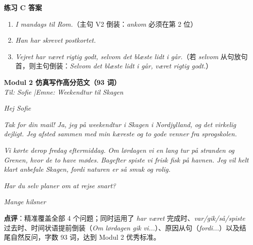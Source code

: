 \begin{answerbox}
\textbf{练习 C 答案}
\begin{enumerate}
  \item \textit{I mandags  til Rom.}（主句 V2 倒装：\textit{ankom} 必须在第 2 位）
  \item \textit{Han har  skrevet postkortet.}
  \item \textit{Vejret har været rigtig godt, selvom det blæste lidt i går.}（若 \textit{selvom} 从句放句首，则主句倒装：\textit{Selvom det blæste lidt i går,  været rigtig godt.}）
\end{enumerate}

\textbf{Modul 2 仿真写作高分范文（93 词）}\\
\textit{Til: Sofie \quad|\quad Emne: Weekendtur til Skagen}

\textit{Hej Sofie}

\textit{Tak for din mail! Ja, jeg  på weekendtur i Skagen i Nordjylland, og det  virkelig dejligt. Jeg  afsted sammen med min kæreste og to gode venner fra sprogskolen.}

\textit{Vi kørte derop fredag eftermiddag. Om lørdagen  vi en lang tur på stranden og  Grenen, hvor de to have mødes. Bagefter spiste vi frisk fisk på havnen. Jeg vil helt klart anbefale Skagen, fordi naturen er så smuk og rolig.}

\textit{Har du selv planer om at rejse snart?}

\textit{Mange hilsner\\
}

\small\textbf{点评}：精准覆盖全部 4 个问题；同时运用了 \textit{har været} 完成时、\textit{var/gik/så/spiste} 过去时、时间状语提前倒装（\textit{Om lørdagen gik vi...}）、原因从句（\textit{fordi...}）以及结尾自然反问，字数 93 词，达到 Modul 2 优秀标准。
\end{answerbox}
